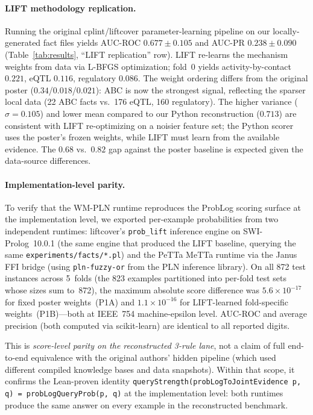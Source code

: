 \documentclass[]{article}
\newcommand{\code}[1]{\texttt{#1}}
\begin{document}
\paragraph{LIFT methodology replication.}
Running the original cplint/liftcover parameter-learning pipeline on our
locally-generated fact files yields AUC-ROC $0.677 \pm 0.105$ and AUC-PR
$0.238 \pm 0.090$ (Table~\ref{tab:results}, ``LIFT replication'' row).
LIFT re-learns the mechanism weights from data via L-BFGS optimization;
fold~0 yields activity-by-contact $0.221$, eQTL $0.116$, regulatory $0.086$.
The weight ordering differs from the original poster ($0.34$/$0.018$/$0.021$):
ABC is now the strongest signal, reflecting the sparser local data (22 ABC facts
vs.\ 176 eQTL, 160 regulatory).  The higher variance ($\sigma = 0.105$) and
lower mean compared to our Python reconstruction ($0.713$) are consistent with
LIFT re-optimizing on a noisier feature set; the Python scorer uses the
poster's frozen weights, while LIFT must learn from the available evidence.
The $0.68$ vs.\ $0.82$ gap against the poster baseline is expected given the
data-source differences.

\paragraph{Implementation-level parity.}
To verify that the WM-PLN runtime reproduces the ProbLog scoring surface
at the implementation level,
we exported per-example probabilities from two independent runtimes:
liftcover's \code{prob\_lift} inference engine on SWI-Prolog~10.0.1
(the same engine that produced the LIFT baseline, querying the same
\code{experiments/facts/*.pl})
and the PeTTa MeTTa runtime via the Janus FFI bridge (using
\code{pln-fuzzy-or} from the PLN inference library).
On all 872 test instances across 5~folds (the 823 examples partitioned into
per-fold test sets whose sizes sum to~872), the maximum absolute score difference
was $5.6 \times 10^{-17}$ for fixed poster weights~(P1A) and
$1.1 \times 10^{-16}$ for LIFT-learned fold-specific weights~(P1B)---both
at IEEE~754 machine-epsilon level.
AUC-ROC and average precision (both computed via scikit-learn) are identical
to all reported digits.

This is \emph{score-level parity on the reconstructed 3-rule lane}, not
a claim of full end-to-end equivalence with the original authors' hidden
pipeline (which used different compiled knowledge bases and data snapshots).
Within that scope, it confirms the Lean-proven identity
\code{queryStrength(probLogToJointEvidence p, q) = probLogQueryProb(p, q)}
at the implementation level: both runtimes produce the same answer on every
example in the reconstructed benchmark.
\end{document}
